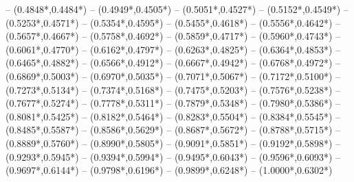 {	-- ({0.4848*\dx},{0.4484*\dy}) %
	-- ({0.4949*\dx},{0.4505*\dy}) %
	-- ({0.5051*\dx},{0.4527*\dy}) %
	-- ({0.5152*\dx},{0.4549*\dy}) %
	-- ({0.5253*\dx},{0.4571*\dy}) %
	-- ({0.5354*\dx},{0.4595*\dy}) %
	-- ({0.5455*\dx},{0.4618*\dy}) %
	-- ({0.5556*\dx},{0.4642*\dy}) %
	-- ({0.5657*\dx},{0.4667*\dy}) %
	-- ({0.5758*\dx},{0.4692*\dy}) %
	-- ({0.5859*\dx},{0.4717*\dy}) %
	-- ({0.5960*\dx},{0.4743*\dy}) %
	-- ({0.6061*\dx},{0.4770*\dy}) %
	-- ({0.6162*\dx},{0.4797*\dy}) %
	-- ({0.6263*\dx},{0.4825*\dy}) %
	-- ({0.6364*\dx},{0.4853*\dy}) %
	-- ({0.6465*\dx},{0.4882*\dy}) %
	-- ({0.6566*\dx},{0.4912*\dy}) %
	-- ({0.6667*\dx},{0.4942*\dy}) %
	-- ({0.6768*\dx},{0.4972*\dy}) %
	-- ({0.6869*\dx},{0.5003*\dy}) %
	-- ({0.6970*\dx},{0.5035*\dy}) %
	-- ({0.7071*\dx},{0.5067*\dy}) %
	-- ({0.7172*\dx},{0.5100*\dy}) %
	-- ({0.7273*\dx},{0.5134*\dy}) %
	-- ({0.7374*\dx},{0.5168*\dy}) %
	-- ({0.7475*\dx},{0.5203*\dy}) %
	-- ({0.7576*\dx},{0.5238*\dy}) %
	-- ({0.7677*\dx},{0.5274*\dy}) %
	-- ({0.7778*\dx},{0.5311*\dy}) %
	-- ({0.7879*\dx},{0.5348*\dy}) %
	-- ({0.7980*\dx},{0.5386*\dy}) %
	-- ({0.8081*\dx},{0.5425*\dy}) %
	-- ({0.8182*\dx},{0.5464*\dy}) %
	-- ({0.8283*\dx},{0.5504*\dy}) %
	-- ({0.8384*\dx},{0.5545*\dy}) %
	-- ({0.8485*\dx},{0.5587*\dy}) %
	-- ({0.8586*\dx},{0.5629*\dy}) %
	-- ({0.8687*\dx},{0.5672*\dy}) %
	-- ({0.8788*\dx},{0.5715*\dy}) %
	-- ({0.8889*\dx},{0.5760*\dy}) %
	-- ({0.8990*\dx},{0.5805*\dy}) %
	-- ({0.9091*\dx},{0.5851*\dy}) %
	-- ({0.9192*\dx},{0.5898*\dy}) %
	-- ({0.9293*\dx},{0.5945*\dy}) %
	-- ({0.9394*\dx},{0.5994*\dy}) %
	-- ({0.9495*\dx},{0.6043*\dy}) %
	-- ({0.9596*\dx},{0.6093*\dy}) %
	-- ({0.9697*\dx},{0.6144*\dy}) %
	-- ({0.9798*\dx},{0.6196*\dy}) %
	-- ({0.9899*\dx},{0.6248*\dy}) %
	-- ({1.0000*\dx},{0.6302*\dy}) %
}
